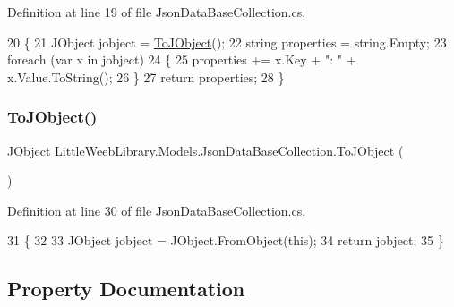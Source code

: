 Definition at line 19 of file Json\+Data\+Base\+Collection.\+cs.


\begin{DoxyCode}
20         \{
21             JObject jobject = \mbox{\hyperlink{class_little_weeb_library_1_1_models_1_1_json_data_base_collection_abb41335632171ada7d3003a69a388392}{ToJObject}}();
22             \textcolor{keywordtype}{string} properties = \textcolor{keywordtype}{string}.Empty;
23             \textcolor{keywordflow}{foreach} (var x \textcolor{keywordflow}{in} jobject)
24             \{
25                 properties += x.Key + \textcolor{stringliteral}{": "} + x.Value.ToString();
26             \}
27             \textcolor{keywordflow}{return} properties;
28         \}
\end{DoxyCode}
\mbox{\label{class_little_weeb_library_1_1_models_1_1_json_data_base_collection_abb41335632171ada7d3003a69a388392}} 
\subsubsection{\texorpdfstring{To\+J\+Object()}{ToJObject()}}
{\footnotesize\ttfamily J\+Object Little\+Weeb\+Library.\+Models.\+Json\+Data\+Base\+Collection.\+To\+J\+Object (\begin{DoxyParamCaption}{ }\end{DoxyParamCaption})}



Definition at line 30 of file Json\+Data\+Base\+Collection.\+cs.


\begin{DoxyCode}
31         \{
32 
33             JObject jobject = JObject.FromObject(\textcolor{keyword}{this});
34             \textcolor{keywordflow}{return} jobject;
35         \}
\end{DoxyCode}


\subsection{Property Documentation}
\mbox{\label{class_little_weeb_library_1_1_models_1_1_json_data_base_collection_ada1f636f42040ebdd7a96b7a388afa7d}} 
